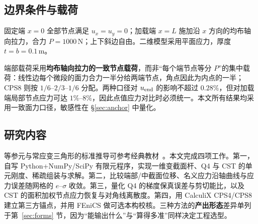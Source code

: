 \subsection{边界条件与载荷}

固定端 $x=0$ 全部节点满足 $u_x=u_y=0$；加载端 $x=L$ 施加沿 $x$ 方向的均布轴向拉力，合力 $P=1000\,\mathrm{N}$；上下斜边自由。二维模型采用平面应力，厚度 $t=b=0.1\,\mathrm{m}$。

端部载荷采用\textbf{均布轴向拉力的一致节点载荷}，而非“每个端节点等分 $P$”的集中载荷：线性边每个微段的面力合力一半分给两端节点，角点因此为内点的一半；CPS8 则按 $1/6$–$2/3$–$1/6$ 分配。两种口径对 $u_{\rm end}$ 的影响不超过 $0.28\%$，但对加载端局部节点应力可达 $1\%$–$8\%$，因此点值应力对比时必须统一。本文所有结果均采用一致面力口径，敏感性在 \S\ref{sec:anchor} 中量化。

\subsection{研究内容}

等参元与常应变三角形的标准推导可参考经典教材~\cite{zienkiewicz2005,bathe2006,hughes2000}。本文完成四项工作。第一，自写 Python+NumPy/SciPy 有限元程序，实现一维变截面杆、Q4 与 CST 的单元刚度、稀疏组装与求解。第二，比较端部/中截面位移、名义应力沿轴曲线与应力误差随网格的 $e$--$\sigma$ 收敛。第三，量化 Q4 的梯度保真误差与剪切能比，以及 CST 的面积加权节点应力恢复与对角线离散度。第四，用 CalculiX CPS4/CPS8 建立第三方锚点，并用 FEniCS 做可选本构校核。三种方法的\textbf{产出形态}差异单列于第~\ref{sec:forms} 节，因为“能输出什么”与“算得多准”同样决定工程选型。